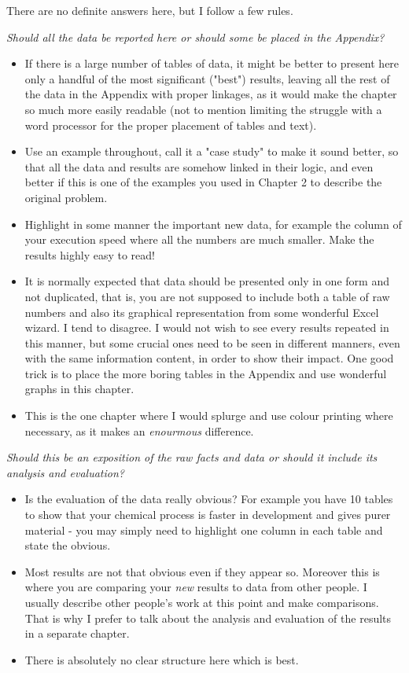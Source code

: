 There are no definite answers here, but I follow a few rules.

\textit{Should all the data be reported here or should some be placed in the Appendix?}
    \begin{itemize}
    \item{If there is a large number of tables of data, it might be better to present here only a handful of the most significant ("best") results, leaving all the rest of the data in the Appendix with proper linkages, as it would make the chapter so much more easily readable (not to mention limiting the struggle with a word processor for the proper placement of tables and text).}
    \item{Use an example throughout, call it a "case study" to make it sound better, so that all the data and results are somehow linked in their logic, and even better if this is one of the examples you used in Chapter 2 to describe the original problem.}
    \item{Highlight in some manner the important new data, for example the column of your execution speed where all the numbers are much smaller. Make the results highly easy to read!}
    \item{It is normally expected that data should be presented only in one form and not duplicated, that is, you are not supposed to include both a table of raw numbers and also its graphical representation from some wonderful Excel wizard. I tend to disagree. I would not wish to see every results repeated in this manner, but some crucial ones need to be seen in different manners, even with the same information content, in order to show their impact. One good trick is to place the more boring tables in the Appendix and use wonderful graphs in this chapter.}
    \item{This is the one chapter where I would splurge and use colour printing where necessary, as it makes an \textit{enourmous} difference.}
    \end{itemize}

\textit{Should this be an exposition of the raw facts and data or should it include its analysis and evaluation?}
     \begin{itemize}
    \item{Is the evaluation of the data really obvious? For example you have 10 tables to show that your chemical process is faster in development and gives purer material - you may simply need to highlight one column in each table and state the obvious.}
    \item{Most results are not that obvious even if they appear so. Moreover this is where you are comparing your \textit{new} results to data from other people. I usually describe other people's work at this point and make comparisons. That is why I prefer to talk about the analysis and evaluation of the results in a separate chapter.}
    \item{There is absolutely no clear structure here which is best.}
    \end{itemize}
